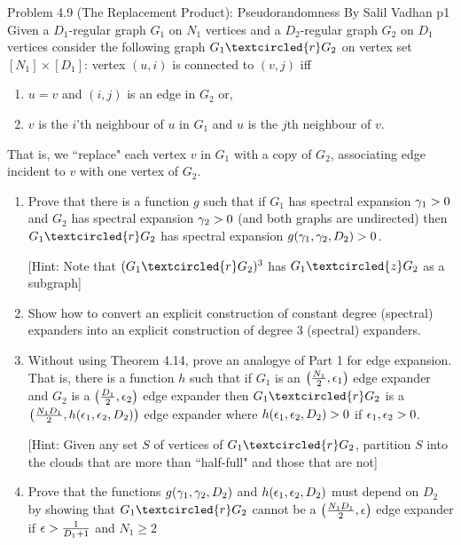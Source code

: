 \documentclass[a4paper, 11pt]{article}
\begin{document}
\begin{problem}{%
		Problem 4.9 (The Replacement Product): Pseudorandomness By Salil Vadhan
	}{p1%
}
Given a $D_1$-regular graph $G_1$ on $N_1$ vertices and a $D_2$-regular graph $G_2$ on $D_1$ vertices consider the following graph $G_1\textcircled{r}G_2$ on vertex set $[N_1]\times [D_1]$: vertex $(u,i)$ is connected to $(v,j)$ iff \begin{enumerate}[label=(\alph*)]
	\item $u=v$ and $(i,j)$ is an edge in $G_2$ or,
	\item $v$ is the $i$'th neighbour of $u$ in $G_1$ and $u$ is the $j$th neighbour of $v$. 
\end{enumerate}
That is, we ``replace" each vertex $v$ in $G_1$ with a copy of $G_2$, associating edge incident to $v$ with one vertex of $G_2$.
\begin{enumerate}
	\item Prove that there is a function $g$ such that if $G_1$ has spectral expansion $\gamma_1>0$ and $G_2$ has spectral expansion $\gamma_2>0$ (and both graphs are undirected) then $G_1\textcircled{r}G_2$ has spectral expansion $g(\gamma_1,\gamma_2,D_2)>0$.
	
	[Hint: Note that $(G_1\textcircled{r}G_2)^3$ has $G_1\textcircled{z}G_2$ as a subgraph]
	\item Show how to convert an explicit construction of constant degree (spectral) expanders into an explicit construction of degree 3 (spectral) expanders.
	\item Without using Theorem 4.14, prove an analogye of Part 1 for edge expansion. That is, there is a function $h$ such that if $G_1$ is an $\left(\frac{N_1}2,\epsilon_1\right)$ edge expander and $G_2$ is a $\left(\frac{D_1}2,\epsilon_2\right)$ edge expander then $G_1\textcircled{r}G_2$ is a $\left(\frac{N_1D_1}{2},h(\epsilon_1,\epsilon_2,D_2)\right)$ edge expander where $h(\epsilon_1,\epsilon_2,D_2)>0$ if $\epsilon_1,\epsilon_2>0$. 
	
	[Hint: Given any set $S$ of vertices of $G_1\textcircled{r}G_2$, partition $S$ into the clouds that are more than ``half-full" and those that are not]
	\item Prove that the functions $g(\gamma_1,\gamma_2,D_2)$ and $h(\epsilon_1,\epsilon_2,D_2)$ must depend on $D_2$ by showing that $G_1\textcircled{r}G_2$ cannot be a $\left(\frac{N_1D_1}2,\epsilon\right)$ edge expander if $\epsilon>\frac1{D_1+1}$ and $N_1\geq 2$
\end{enumerate}
\end{problem}
\solve{

}
\end{document}
